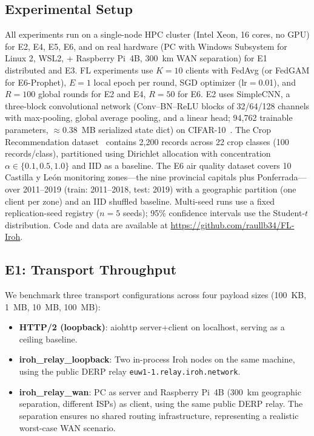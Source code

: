 ﻿\documentclass[journal]{IEEEtran}
\begin{document}
\subsection{Experimental Setup}

All experiments run on a single-node HPC cluster (Intel Xeon, 16 cores, no GPU) for E2, E4, E5, E6, and on real hardware (PC with Windows Subsystem for Linux 2, WSL2, + Raspberry Pi~4B, 300~km WAN separation) for E1 distributed and E3. FL experiments use $K{=}10$ clients with FedAvg (or FedGAM for E6-Prophet), $E{=}1$ local epoch per round, SGD optimizer (lr$=$0.01), and $R{=}100$ global rounds for E2 and E4, $R{=}50$ for E6. E2 uses SimpleCNN, a three-block convolutional network (Conv--BN--ReLU blocks of 32/64/128 channels with max-pooling, global average pooling, and a linear head; 94{,}762 trainable parameters, $\approx$0.38~MB serialized state dict) on CIFAR-10~\cite{cifar2009}. The Crop Recommendation dataset~\cite{cropdataset} contains 2,200 records across 22 crop classes (100 records/class), partitioned using Dirichlet allocation with concentration $\alpha \in \{0.1, 0.5, 1.0\}$ and IID as a baseline. The E6 air quality dataset covers 10 Castilla y Le\'on monitoring zones---the nine provincial capitals plus Ponferrada---over 2011--2019 (train: 2011--2018, test: 2019) with a geographic partition (one client per zone) and an IID shuffled baseline. Multi-seed runs use a fixed replication-seed registry ($n{=}5$ seeds); 95\% confidence intervals use the Student-$t$ distribution. Code and data are available at \url{https://github.com/raullb34/FL-Iroh}.

\subsection{E1: Transport Throughput}
\label{sec:e1}

We benchmark three transport configurations across four payload sizes (100~KB, 1~MB, 10~MB, 100~MB):

\begin{itemize}
    \item \textbf{HTTP/2 (loopback)}: aiohttp server+client on localhost, serving as a ceiling baseline.
    \item \textbf{iroh\_relay\_loopback}: Two in-process Iroh nodes on the same machine, using the public DERP relay \texttt{euw1-1.relay.iroh.network}.
    \item \textbf{iroh\_relay\_wan}: PC as server and Raspberry Pi~4B (300~km geographic separation, different ISPs) as client, using the same public DERP relay. The separation ensures no shared routing infrastructure, representing a realistic worst-case WAN scenario.
\end{itemize}
\end{document}
